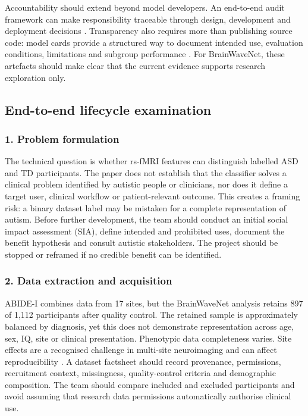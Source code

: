 \documentclass[11pt,a4paper]{article}
\begin{document}
Accountability should extend beyond model developers. An end-to-end audit framework can make responsibility traceable through design, development and deployment decisions \parencite{raji2020}. Transparency also requires more than publishing source code: model cards provide a structured way to document intended use, evaluation conditions, limitations and subgroup performance \parencite{mitchell2019}. For BrainWaveNet, these artefacts should make clear that the current evidence supports research exploration only.

\subsection{End-to-end lifecycle examination}
\subsubsection{1. Problem formulation}
The technical question is whether rs-fMRI features can distinguish labelled ASD and TD participants. The paper does not establish that the classifier solves a clinical problem identified by autistic people or clinicians, nor does it define a target user, clinical workflow or patient-relevant outcome. This creates a framing risk: a binary dataset label may be mistaken for a complete representation of autism. Before further development, the team should conduct an initial social impact assessment (SIA), define intended and prohibited uses, document the benefit hypothesis and consult autistic stakeholders. The project should be stopped or reframed if no credible benefit can be identified.

\subsubsection{2. Data extraction and acquisition}
ABIDE-I combines data from 17 sites, but the BrainWaveNet analysis retains 897 of 1,112 participants after quality control. The retained sample is approximately balanced by diagnosis, yet this does not demonstrate representation across age, sex, IQ, site or clinical presentation. Phenotypic data completeness varies. Site effects are a recognised challenge in multi-site neuroimaging and can affect reproducibility \parencite{abraham2017,abideharmonization2022}. A dataset factsheet should record provenance, permissions, recruitment context, missingness, quality-control criteria and demographic composition. The team should compare included and excluded participants and avoid assuming that research data permissions automatically authorise clinical use.
\end{document}
